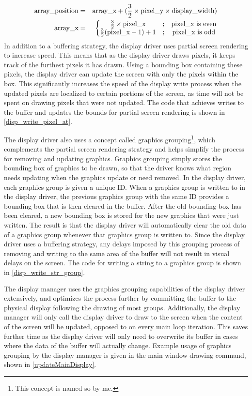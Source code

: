 \begin{eqnarray}
\text{array\_position} &=& \text{array\_x} + (\frac{3}{2}\times \text{pixel\_y} \times \text{display\_width})
\\
\text{array\_x} &=& \left\{\mat[\frac{3}{2}\times \text{pixel\_x} &;&\text{pixel\_x is even}\\\frac{3}{2}(\text{pixel\_x}-1)+1 &;&\text{pixel\_x is odd}]\right.
\end{eqnarray}
\nl
\indent In addition to a buffering strategy, the display driver uses partial screen rendering to increase speed. This means that as the display driver draws pixels, it keeps track of the furthest pixels it has drawn. Using a bounding box containing these pixels, the display driver can update the screen with only the pixels within the box. This significantly increases the speed of the display write process when the updated pixels are localized to certain portions of the screen, as time will not be spent on drawing pixels that were not updated. The code that achieves writes to the buffer and updates the bounds for partial screen rendering is shown in \ref{disp_write_pixel_at}.

The display driver also uses a concept called graphics grouping\footnote{This concept is named so by me.}, which complements the partial screen rendering strategy and helps simplify the process for removing and updating graphics. Graphics grouping simply stores the bounding box of graphics to be drawn, so that the driver knows what region needs updating when the graphics update or need removed. In the display driver, each graphics group is given a unique ID. When a graphics group is written to in the display driver, the previous graphics group with the same ID provides a bounding box that is then cleared in the buffer. After the old bounding box has been cleared, a new bounding box is stored for the new graphics that were just written. The result is that the display driver will automatically clear the old data of a graphics group whenever that graphics group is written to. Since the display driver uses a buffering strategy, any delays imposed by this grouping process of removing and writing to the same area of the buffer will not result in visual delays on the screen. The code for writing a string to a graphics group is shown in \ref{disp_write_str_group}.

The display manager uses the graphics grouping capabilities of the display driver extensively, and optimizes the process further by committing the buffer to the physical display following the drawing of most groups. Additionally, the display manager will only call the display driver to draw to the screen when the content of the screen will be updated, opposed to on every main loop iteration. This saves further time as the display driver will only need to overwrite its buffer in cases where the data of the buffer will actually change. Example usage of graphics grouping by the display manager is given in the main window drawing command, shown in \ref{updateMainDisplay}.

